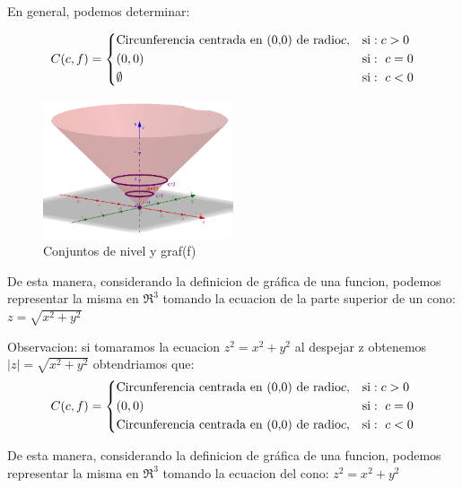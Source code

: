 \begin{definition} 
En general, podemos determinar: 

   \[
        C(c,f)=
        \begin{dcases}
           \textnormal{Circunferencia centrada en (0,0) de radio} c,  & \textnormal{si}:  c>0 \\
(0,0)  & \textnormal{si}:\ c=0\\
\emptyset  & \textnormal{si}:\ c<0\\
        \end{dcases}
    \]
\begin{figure}[h!] %
    \centering
    \includegraphics[width=0.5\textwidth]{../figs/conjunto2_r3.png} %
    \caption{Conjuntos de nivel y graf(f)}
    \label{fig:ejemplo} %
\end{figure}

De esta manera, considerando la definicion de gráfica de una funcion, podemos representar la misma en $\Re^3$ tomando  la ecuacion de la parte superior de un cono: $z=\sqrt{x^2+y^2}$


Observacion: si tomaramos la ecuacion $z^2=x^2+y^2$ al despejar z obtenemos $|z|=\sqrt{x^2+y^2}$ obtendriamos que: 
 \[
        C(c,f)=
        \begin{dcases}
           \textnormal{Circunferencia centrada en (0,0) de radio} c,  & \textnormal{si}:  c>0 \\
(0,0)  & \textnormal{si}:\ c=0\\
\textnormal{Circunferencia centrada en (0,0) de radio} c,  & \textnormal{si}:\ c<0\\
        \end{dcases}
    \]

De esta manera, considerando la definicion de gráfica de una funcion, podemos representar la misma en $\Re^3$ tomando  la ecuacion del cono: $z^2=x^2+y^2$


\end{definition}

